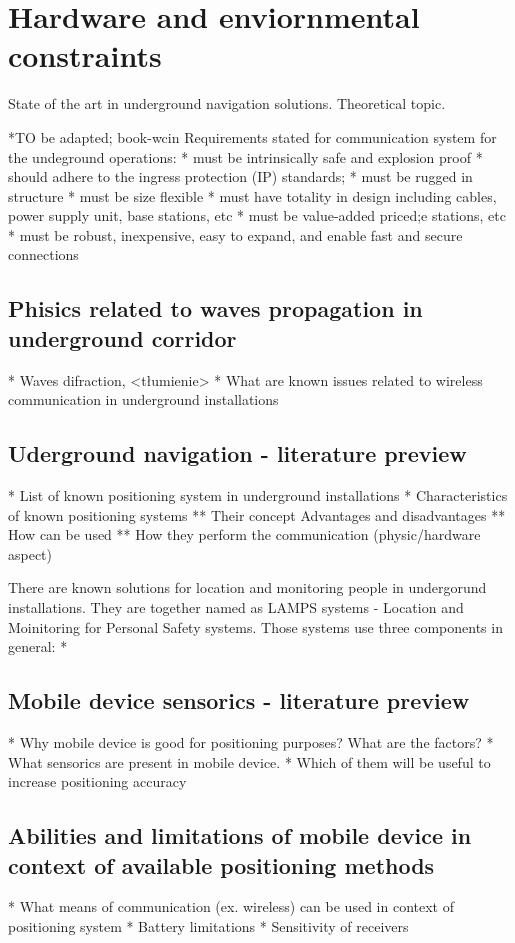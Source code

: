 \documentclass[../main.tex]{subfiles}
\begin{document}
\chapter{Hardware and enviornmental constraints}
State of the art in underground navigation solutions. Theoretical topic.

*TO be adapted; book-wcin
Requirements stated for communication system for the undeground operations:
* must be intrinsically safe and explosion proof
* should adhere to the ingress protection (IP) standards;
* must be rugged in structure
* must be size flexible
* must have totality in design including cables, power supply unit, base stations, etc
* must be value-added priced;e stations, etc
* must be robust, inexpensive, easy to expand,
and enable fast and secure connections

\section{Phisics related to waves propagation in underground corridor}

* Waves difraction, <tłumienie>
* What are known issues related to wireless communication in underground installations


\section{Uderground navigation - literature preview}
* List of known positioning system in underground installations
* Characteristics of known positioning systems
** Their concept Advantages and disadvantages
** How can be used
** How they perform the communication (physic/hardware aspect)

There are known solutions for location and monitoring people in undergorund installations. They are together named as LAMPS systems - Location and Moinitoring for Personal Safety systems. Those systems use three components in general:
*

\section{Mobile device sensorics - literature preview}
* Why mobile device is good for positioning purposes? What are the factors?
* What sensorics are present in mobile device.
* Which of them will be useful to increase positioning accuracy

\section{Abilities and limitations of mobile device in context of available positioning methods}
* What means of communication (ex. wireless) can be used in context of positioning system
* Battery limitations
* Sensitivity of receivers
\end{document}
